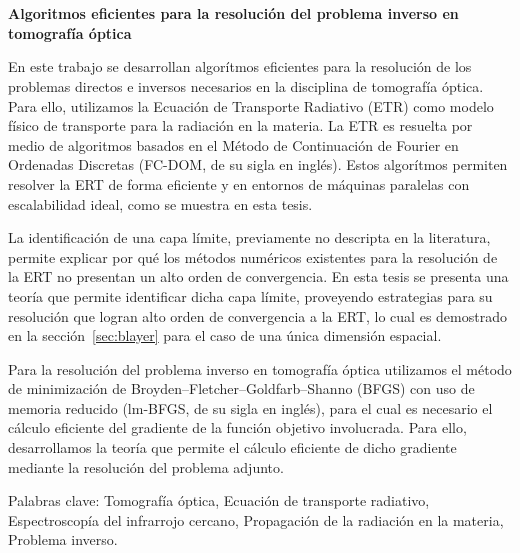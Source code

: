 \chapter*{}%
%

\begin{center}
\begin{large}
\textbf{Algoritmos eficientes para la resolución 
del problema inverso en tomografía óptica}
\end{large}
\end{center}

\vspace{1cm}
En este trabajo se desarrollan   
algorítmos eficientes para la resolución de los problemas directos 
e inversos necesarios en la disciplina de tomografía óptica. Para ello, utilizamos la Ecuación de Transporte 
Radiativo (ETR) como modelo físico de transporte para la radiación 
en la materia. 
La ETR es resuelta por medio de algoritmos basados en el Método  
de Continuación de Fourier en Ordenadas Discretas (FC-DOM, de su sigla en inglés). Estos algorítmos 
permiten resolver la ERT de forma eficiente y en entornos de máquinas paralelas 
con escalabilidad ideal, como se muestra en esta tesis. 

La identificación de una capa límite, previamente no descripta en la literatura, 
permite explicar por qué los métodos numéricos existentes para la resolución de la ERT 
no presentan un alto orden de convergencia. En esta tesis se presenta 
una teoría que permite identificar dicha capa límite, proveyendo  
estrategias para su resolución que logran alto orden de convergencia 
a la ERT, lo cual es demostrado en la sección~\ref{sec:blayer} para el caso de una única dimensión espacial.

Para la resolución del problema inverso en tomografía óptica utilizamos el método de minimización 
de Broyden–Fletcher–Goldfarb–Shanno (BFGS) con uso de memoria reducido 
(lm-BFGS, de su sigla en inglés), 
para el cual es necesario el cálculo eficiente del gradiente 
de la función objetivo involucrada. Para ello, desarrollamos la teoría 
que permite el cálculo eficiente de dicho gradiente  
mediante la resolución del problema adjunto. 


\vspace{1cm}
\noindent
Palabras clave: 
Tomografía óptica,
Ecuación de transporte radiativo, 
Espectroscopía del infrarrojo cercano, 
Propagación de la radiación en la materia,
Problema inverso.
